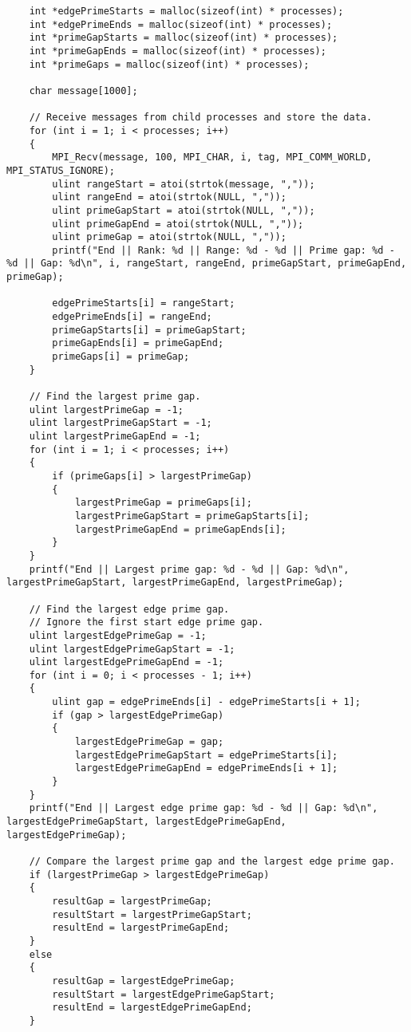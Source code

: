 \documentclass[12pt]{article}
\begin{document}
{\begin{lstlisting}
    int *edgePrimeStarts = malloc(sizeof(int) * processes);
    int *edgePrimeEnds = malloc(sizeof(int) * processes);
    int *primeGapStarts = malloc(sizeof(int) * processes);
    int *primeGapEnds = malloc(sizeof(int) * processes);
    int *primeGaps = malloc(sizeof(int) * processes);

    char message[1000];

    // Receive messages from child processes and store the data.
    for (int i = 1; i < processes; i++)
    {
        MPI_Recv(message, 100, MPI_CHAR, i, tag, MPI_COMM_WORLD, MPI_STATUS_IGNORE);
        ulint rangeStart = atoi(strtok(message, ","));
        ulint rangeEnd = atoi(strtok(NULL, ","));
        ulint primeGapStart = atoi(strtok(NULL, ","));
        ulint primeGapEnd = atoi(strtok(NULL, ","));
        ulint primeGap = atoi(strtok(NULL, ","));
        printf("End || Rank: %d || Range: %d - %d || Prime gap: %d - %d || Gap: %d\n", i, rangeStart, rangeEnd, primeGapStart, primeGapEnd, primeGap);

        edgePrimeStarts[i] = rangeStart;
        edgePrimeEnds[i] = rangeEnd;
        primeGapStarts[i] = primeGapStart;
        primeGapEnds[i] = primeGapEnd;
        primeGaps[i] = primeGap;
    }

    // Find the largest prime gap.
    ulint largestPrimeGap = -1;
    ulint largestPrimeGapStart = -1;
    ulint largestPrimeGapEnd = -1;
    for (int i = 1; i < processes; i++)
    {
        if (primeGaps[i] > largestPrimeGap)
        {
            largestPrimeGap = primeGaps[i];
            largestPrimeGapStart = primeGapStarts[i];
            largestPrimeGapEnd = primeGapEnds[i];
        }
    }
    printf("End || Largest prime gap: %d - %d || Gap: %d\n", largestPrimeGapStart, largestPrimeGapEnd, largestPrimeGap);

    // Find the largest edge prime gap.
    // Ignore the first start edge prime gap.
    ulint largestEdgePrimeGap = -1;
    ulint largestEdgePrimeGapStart = -1;
    ulint largestEdgePrimeGapEnd = -1;
    for (int i = 0; i < processes - 1; i++)
    {
        ulint gap = edgePrimeEnds[i] - edgePrimeStarts[i + 1];
        if (gap > largestEdgePrimeGap)
        {
            largestEdgePrimeGap = gap;
            largestEdgePrimeGapStart = edgePrimeStarts[i];
            largestEdgePrimeGapEnd = edgePrimeEnds[i + 1];
        }
    }
    printf("End || Largest edge prime gap: %d - %d || Gap: %d\n", largestEdgePrimeGapStart, largestEdgePrimeGapEnd, largestEdgePrimeGap);

    // Compare the largest prime gap and the largest edge prime gap.
    if (largestPrimeGap > largestEdgePrimeGap)
    {
        resultGap = largestPrimeGap;
        resultStart = largestPrimeGapStart;
        resultEnd = largestPrimeGapEnd;
    }
    else
    {
        resultGap = largestEdgePrimeGap;
        resultStart = largestEdgePrimeGapStart;
        resultEnd = largestEdgePrimeGapEnd;
    }


\end{lstlisting}}
\end{document}

